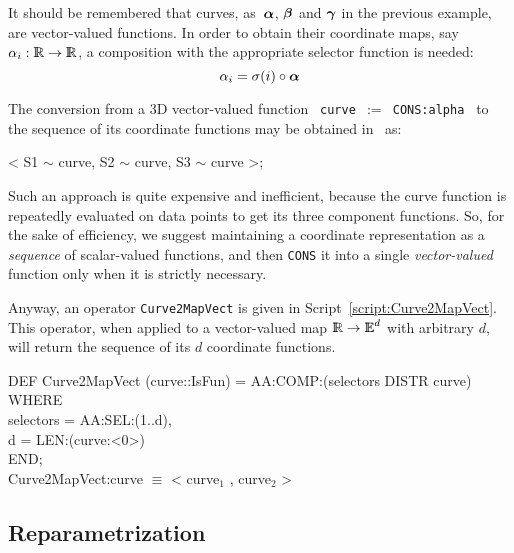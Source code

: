 \documentclass{31x47jw}
\begin{document}
\begin{example}
\label{ex:5:coordinatemaps}
    
It should be remembered that curves, as~${\mbox{\boldmath $\alpha$}}$, ${\mbox{\boldmath $\beta$}}$ and
${\mbox{\boldmath $\gamma$}}$ in the previous example, are vector-valued functions.  In order
to obtain their coordinate maps, say $\alpha_{i}:\mathbb{I\!\!R}\rightarrow\mathbb{I\!\!R}$, a
composition with the appropriate selector function is needed:
\[
\alpha_{i} = \sigma(i)\circ{\mbox{\boldmath $\alpha$}}
\]

The conversion from a 3D vector-valued function \texttt{ curve $:=$
CONS:alpha } to the sequence of its coordinate functions may be obtained
in \pl\ as:
\begin{smallplasm}
< S1 $\sim$ curve, S2 $\sim$ curve, S3 $\sim$ curve >;
\end{smallplasm}
Such an approach is quite expensive and inefficient, because the curve
function is repeatedly evaluated on data points to get its three
component functions.  So, for the sake of efficiency, we suggest 
maintaining a coordinate representation as a \emph{sequence} of
scalar-valued functions, and then \texttt{CONS} it into a single
\emph{vector-valued} function only when it is strictly necessary.

Anyway, an operator \texttt{Curve2MapVect} is given in
Script~\ref{script:Curve2MapVect}.  This operator, when applied to a
vector-valued map $\mathbb{I\!\!R}\rightarrow\mathbb{I\!\!E}^{d}$ with arbitrary $d$, will
return the sequence of its $d$ coordinate functions.  

\begin{script} 
\begin{smallplasm}
DEF Curve2MapVect  (curve::IsFun) = AA:COMP:(selectors DISTR curve)\\
WHERE\+\\
  selectors = AA:SEL:(1..d),\\
  d = LEN:(curve:<0>)\-\\
END;\\[0.3cm]

Curve2MapVect:curve $\equiv$ < curve$_{1}$ , curve$_{2}$ >
\end{smallplasm}
\label{script:Curve2MapVect}
\end{script}

\end{example}




\subsection{Reparametrization}
\label{sec:8:Reparametrization}
\end{document}
